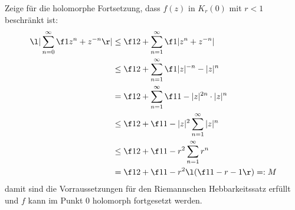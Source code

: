 \documentclass[a4paper]{scrartcl}
\begin{document}
\begin{aufgabe}
\begin{enumerate}[a)]
				Zeige für die holomorphe Fortsetzung, dass $f(z)$ in $K_r(0)$ mit $r<1$ beschränkt ist:
				\begin{align*}
					\l| \sum_{n=0}^\infty \f 1{z^n + z^{-n}} \r|
					&\le \f 12 + \sum_{n=1}^\infty \f 1{|z^n + z^{-n}|} \\
					&\le \f 12 + \sum_{n=1}^\infty \f 1{|z|^{-n}-|z|^n} \\
					&= \f 12 + \sum_{n=1}^\infty \f 1{1-|z|^{2n}} \cdot |z|^n \\
					&\le \f 12 + \f 1{1-|z|^2} \sum_{n=1}^\infty |z|^n \\
					&\le \f 12 + \f 1{1-r^2} \sum_{n=1}^\infty r^n \\
					&= \f 12 + \f 1{1-r^2} \l( \f 1{1-r} - 1\r) =: M
				\end{align*}
				damit sind die Vorraussetzungen für den Riemannschen Hebbarkeitssatz erfüllt und $f$ kann im Punkt $0$ holomorph fortgesetzt werden.
		\end{enumerate}
	\end{aufgabe}
	
\end{document}
